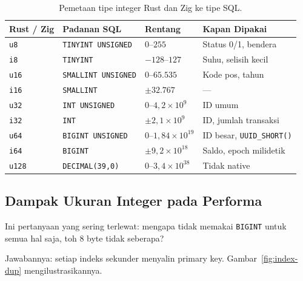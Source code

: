 \documentclass[11pt,a4paper]{article}
\begin{document}
\begin{table}[H]
	\centering
	\caption{Pemetaan tipe integer Rust dan Zig ke tipe SQL.}
	\label{tab:int-map}
	\small
	\begin{tabular}{l l l l}
		\toprule
		Rust / Zig    & Padanan SQL                & Rentang                      & Kapan Dipakai                    \\
		\midrule
		\texttt{u8}   & \texttt{TINYINT UNSIGNED}  & $0$--$255$                   & Status 0/1, bendera              \\
		\texttt{i8}   & \texttt{TINYINT}           & $-128$--$127$                & Suhu, selisih kecil              \\
		\texttt{u16}  & \texttt{SMALLINT UNSIGNED} & $0$--$65.535$                & Kode pos, tahun                  \\
		\texttt{i16}  & \texttt{SMALLINT}          & $\pm 32.767$                 & ---                              \\
		\texttt{u32}  & \texttt{INT UNSIGNED}      & $0$--$4{,}2 \times 10^9$     & ID umum                          \\
		\texttt{i32}  & \texttt{INT}               & $\pm 2{,}1 \times 10^9$      & ID, jumlah transaksi             \\
		\texttt{u64}  & \texttt{BIGINT UNSIGNED}   & $0$--$1{,}84 \times 10^{19}$ & ID besar, \texttt{UUID\_SHORT()} \\
		\texttt{i64}  & \texttt{BIGINT}            & $\pm 9{,}2 \times 10^{18}$   & Saldo, epoch milidetik           \\
		\texttt{u128} & \texttt{DECIMAL(39,0)}     & $0$--$3{,}4 \times 10^{38}$  & Tidak native                     \\
		\bottomrule
	\end{tabular}
\end{table}

\subsection{Dampak Ukuran Integer pada Performa}

Ini pertanyaan yang sering terlewat: mengapa tidak memakai \texttt{BIGINT} untuk semua hal saja, toh 8 byte tidak seberapa?

Jawabannya: setiap indeks sekunder menyalin primary key. Gambar~\ref{fig:index-dup} mengilustrasikannya.
\end{document}
